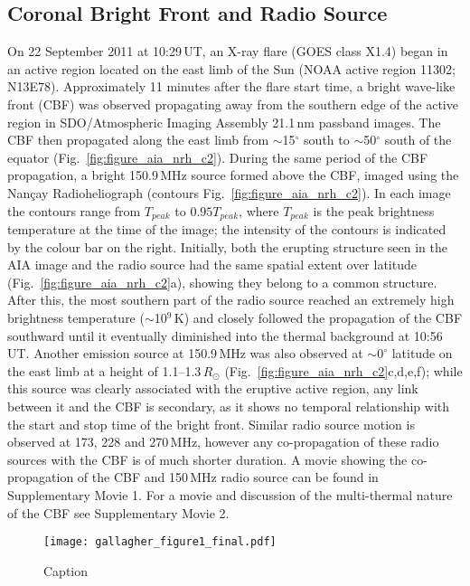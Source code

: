 \subsection{Coronal Bright Front and Radio Source}\label{sec:10}
On 22 September 2011 at 10:29\,UT, an X-ray flare (GOES class X1.4) began in an active region located on the east limb of the Sun (NOAA active region 11302; N13E78). Approximately 11 minutes after the flare start time, a bright wave-like front (CBF) was observed propagating away from the southern edge of the active region in SDO/Atmospheric Imaging Assembly \citep[AIA;][]{lemen2012} 21.1\,nm passband images. The CBF then propagated along the east limb from $\sim$15$^{\circ}\,$\,south to $\sim$50$^{\circ}\,$\,south of the equator (Fig.~\ref{fig:figure_aia_nrh_c2}). During the same period of the CBF propagation, a bright 150.9\,MHz source formed above the CBF, imaged using the Nan\c{c}ay Radioheliograph \citep[NRH;][]{kerdraon1997} (contours Fig.~\ref{fig:figure_aia_nrh_c2}). In each image the contours range from $T_{peak}$ to $0.95T_{peak}$, where $T_{peak}$ is the peak brightness temperature at the time of the image; the intensity of the contours is indicated by the colour bar on the right. Initially, both the erupting structure seen in the AIA image and the radio source had the same spatial extent over latitude (Fig.~\ref{fig:figure_aia_nrh_c2}a), showing they belong to a common structure. After this, the most southern part of the radio source reached an extremely high brightness temperature ($\sim$10$^9$\,K) and closely followed the propagation of the CBF southward until it eventually diminished into the thermal background at 10:56\,UT. Another emission source at 150.9\,MHz was also observed at $\sim$$0^{\circ}$ latitude on the east limb at a height of 1.1--1.3$\,R_{\odot}$ (Fig.~\ref{fig:figure_aia_nrh_c2}c,d,e,f); while this source was clearly associated with the eruptive active region, any link between it and the CBF is secondary, as it shows no temporal relationship with the start and stop time of the bright front. Similar radio source motion is observed at 173, 228 and 270\,MHz, however any co-propagation of these radio sources with the CBF is of much shorter duration. A movie showing the co-propagation of the CBF and 150\,MHz radio source can be found in Supplementary Movie 1. For a movie and discussion of the multi-thermal nature of the CBF see Supplementary Movie 2.
\begin{sidewaysfigure}
    \centering
	\texttt{[image: gallagher\_figure1\_final.pdf]}
	\caption{Caption}
	\label{fig:cbf_radio_source}
\end{sidewaysfigure}


